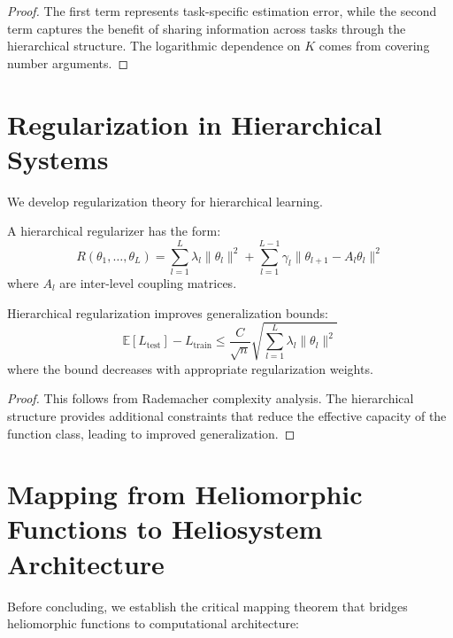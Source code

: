 \begin{proof}
The first term represents task-specific estimation error, while the second term captures the benefit of sharing information across tasks through the hierarchical structure. The logarithmic dependence on $K$ comes from covering number arguments.
\end{proof}

\section{Regularization in Hierarchical Systems}

We develop regularization theory for hierarchical learning.

\begin{definition}
\label{def:hierarchical_regularization}
A hierarchical regularizer has the form:
$$R(\theta_1, \ldots, \theta_L) = \sum_{l=1}^L \lambda_l \|\theta_l\|^2 + \sum_{l=1}^{L-1} \gamma_l \|\theta_{l+1} - A_l \theta_l\|^2$$
where $A_l$ are inter-level coupling matrices.
\end{definition}

\begin{theorem}
\label{thm:regularization_generalization}
Hierarchical regularization improves generalization bounds:
$$\mathbb{E}[L_{\text{test}}] - L_{\text{train}} \leq \frac{C}{\sqrt{n}} \sqrt{\sum_{l=1}^L \lambda_l \|\theta_l\|^2}$$
where the bound decreases with appropriate regularization weights.
\end{theorem}

\begin{proof}
This follows from Rademacher complexity analysis. The hierarchical structure provides additional constraints that reduce the effective capacity of the function class, leading to improved generalization.
\end{proof}

\section{Mapping from Heliomorphic Functions to Heliosystem Architecture}

Before concluding, we establish the critical mapping theorem that bridges heliomorphic functions to computational architecture:

